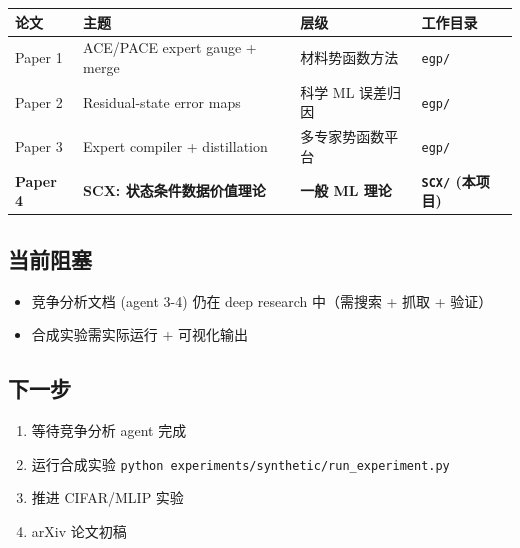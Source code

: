\documentclass[
  12pt,
]{ctexart}
\providecommand{\tightlist}{%
  \setlength{\itemsep}{0pt}\setlength{\parskip}{0pt}}
\begin{document}
\begin{longtable}[]{@{}
  >{\raggedright\arraybackslash}p{}
  >{\raggedright\arraybackslash}p{}
  >{\raggedright\arraybackslash}p{}
  >{\raggedright\arraybackslash}p{}@{}}
\toprule\noalign{}
\begin{minipage}[b]{\linewidth}\raggedright
论文
\end{minipage} & \begin{minipage}[b]{\linewidth}\raggedright
主题
\end{minipage} & \begin{minipage}[b]{\linewidth}\raggedright
层级
\end{minipage} & \begin{minipage}[b]{\linewidth}\raggedright
工作目录
\end{minipage} \\
\midrule\noalign{}
\endhead
\bottomrule\noalign{}
\endlastfoot
Paper 1 & ACE/PACE expert gauge + merge & 材料势函数方法 &
\texttt{egp/} \\
Paper 2 & Residual-state error maps & 科学 ML 误差归因 &
\texttt{egp/} \\
Paper 3 & Expert compiler + distillation & 多专家势函数平台 &
\texttt{egp/} \\
\textbf{Paper 4} & \textbf{SCX: 状态条件数据价值理论} & \textbf{一般 ML
理论} & \textbf{\texttt{SCX/} (本项目)} \\
\end{longtable}

\subsection{当前阻塞}\label{ux5f53ux524dux963bux585e}

\begin{itemize}
\tightlist
\item
  竞争分析文档 (agent 3-4) 仍在 deep research 中（需搜索 + 抓取 + 验证）
\item
  合成实验需实际运行 + 可视化输出
\end{itemize}

\subsection{下一步}\label{ux4e0bux4e00ux6b65}

\begin{enumerate}
\def\labelenumi{\arabic{enumi}.}
\tightlist
\item
  等待竞争分析 agent 完成
\item
  运行合成实验 \texttt{python\ experiments/synthetic/run\_experiment.py}
\item
  推进 CIFAR/MLIP 实验
\item
  arXiv 论文初稿
\end{enumerate}
\end{document}
